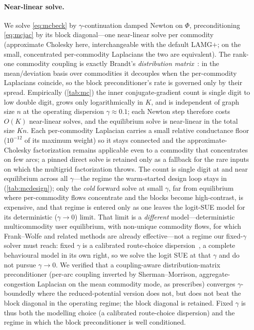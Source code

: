 \documentclass[ijoc]{informs3}
\begin{document}
\paragraph{Near-linear solve.}
We solve \cref{eq:mcbeck} by $\gamma$-continuation damped Newton on $\Phi$, preconditioning \cref{eq:mcjac} by its
block diagonal---one near-linear solve per commodity (approximate Cholesky here, interchangeable with the default
LAMG$+$; on the small, concentrated per-commodity Laplacians the two are equivalent). The rank-one commodity coupling is
exactly Brandt's \emph{distribution matrix}~\citep{brandt1984}: in the mean/deviation basis over commodities it
decouples when the per-commodity Laplacians coincide, so the block preconditioner's rate is governed only by
their spread. Empirically (\cref{tab:mc}) the inner conjugate-gradient count is single digit to low double digit,
grows only logarithmically in $K$, and is independent of graph size $n$ at the operating dispersion
$\gamma\approx0.1$; each Newton step therefore costs $O(K)$ near-linear solves, and the equilibrium solve is
near-linear in the total size $Kn$. Each per-commodity Laplacian carries a small relative conductance floor
($10^{-12}$ of its maximum weight) so it stays connected and the approximate-Cholesky factorization remains
applicable even to a commodity that concentrates on few arcs; a pinned direct solve is retained only as a
fallback for the rare inputs on which the multigrid factorization throws. The count is single digit at and near
equilibrium across all $\gamma$---the regime the warm-started design loop stays in (\cref{tab:mcdesign}); only the
\emph{cold} forward solve at small $\gamma$, far from equilibrium where per-commodity flows concentrate and the
blocks become high-contrast, is expensive, and that regime is entered only as one leaves the logit-SUE model for
its deterministic ($\gamma\to0$) limit. That limit is a \emph{different} model---deterministic multicommodity
user equilibrium, with non-unique commodity flows, for which Frank--Wolfe and related methods are already
effective---not a regime our fixed-$\gamma$ solver must reach: fixed $\gamma$ is a calibrated route-choice
dispersion~\citep{fisk1980,daganzo1977}, a complete behavioural model in its own right, so we solve the logit SUE
at that $\gamma$ and do not pursue $\gamma\to0$. We verified that a coupling-aware distribution-matrix preconditioner
(per-arc coupling inverted by Sherman--Morrison, aggregate-congestion Laplacian on the mean commodity mode, as
\citet{brandt1984} prescribes) converges $\gamma$-boundedly where the reduced-potential version does not, but
does not beat the block diagonal in the operating regime; the block diagonal is retained. Fixed $\gamma$ is thus both the
modelling choice (a calibrated route-choice dispersion) and the regime in which the block preconditioner is well
conditioned.
\end{document}
